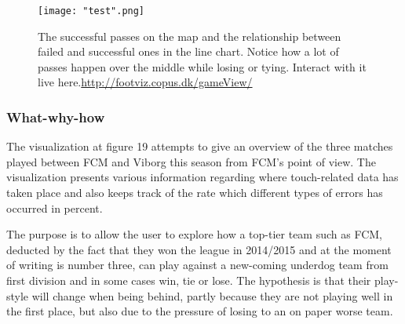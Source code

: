 \documentclass[Report.tex]{subfiles}
\begin{document}
 

\begin{figure}
	\center
	\texttt{[image: "test".png]}
	\caption{The successful passes on the map and the relationship between failed and successful ones in the line chart. Notice how a lot of passes happen over the middle while losing or tying. Interact with it live here.\url{http://footviz.copus.dk/gameView/}}
	\label{Fig:}
\end{figure}


\subsubsection{What-why-how}
The visualization at figure 19 attempts to give an overview of the three matches played between FCM and Viborg this season from FCM's point of view. The visualization presents various information regarding where touch-related data has taken place and also keeps track of the rate which different types of errors has occurred in percent.

The purpose is to allow the user to explore how a top-tier team such as FCM, deducted by the fact that they won the league in 2014/2015 and at the moment of writing is number three, can play against a new-coming underdog team from first division and in some cases win,  tie or lose. The hypothesis is that their play-style will change when being behind, partly because they are not playing well in the first place, but also due to the pressure of losing to an on paper worse team.
\end{document}
